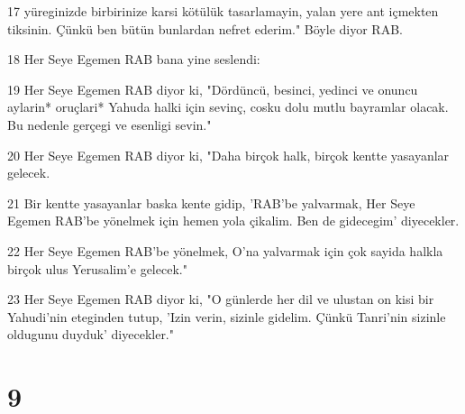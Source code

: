 \par 17 yüreginizde birbirinize karsi kötülük tasarlamayin, yalan yere ant içmekten tiksinin. Çünkü ben bütün bunlardan nefret ederim." Böyle diyor RAB.
\par 18 Her Seye Egemen RAB bana yine seslendi:
\par 19 Her Seye Egemen RAB diyor ki, "Dördüncü, besinci, yedinci ve onuncu aylarin* oruçlari* Yahuda halki için sevinç, cosku dolu mutlu bayramlar olacak. Bu nedenle gerçegi ve esenligi sevin."
\par 20 Her Seye Egemen RAB diyor ki, "Daha birçok halk, birçok kentte yasayanlar gelecek.
\par 21 Bir kentte yasayanlar baska kente gidip, 'RAB'be yalvarmak, Her Seye Egemen RAB'be yönelmek için hemen yola çikalim. Ben de gidecegim' diyecekler.
\par 22 Her Seye Egemen RAB'be yönelmek, O'na yalvarmak için çok sayida halkla birçok ulus Yerusalim'e gelecek."
\par 23 Her Seye Egemen RAB diyor ki, "O günlerde her dil ve ulustan on kisi bir Yahudi'nin eteginden tutup, 'Izin verin, sizinle gidelim. Çünkü Tanri'nin sizinle oldugunu duyduk' diyecekler."

\chapter{9}

